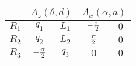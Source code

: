 \begin{tabular}{c|c|c|c|c|}  
            \cline{2-5} &
            \multicolumn{2}{|c|}{$A_z(\theta,d)$} &
            \multicolumn{2}{|c|}{$A_x(\alpha,a)$} \\
            \hline
        \multicolumn{1}{|c|}{$R_1$} & $q_{1}$ & $L_{1}$ & $-{{\pi}\over{2}}$ & $0$ \\
            \hline
        \multicolumn{1}{|c|}{$R_2$} & $q_{2}$ & $L_{2}$ & ${{\pi}\over{2}}$ & $0$ \\
            \hline
        \multicolumn{1}{|c|}{$R_3$} & $-{{\pi}\over{2}}$ & $q_{3}$ & $0$ & $0$ \\
            \hline
\end{tabular}
